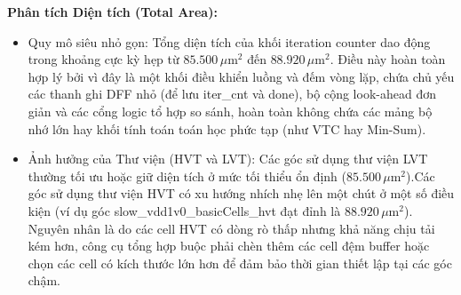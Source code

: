\documentclass[12pt,a4paper,oneside]{book}
\begin{document}
\begin{table}[H]
\centering
{}
\caption{Tổng hợp thông số Diện tích và Công suất của khối Iteration Counter qua các process corners.}
\end{table}

\textbf{Phân tích Diện tích (Total Area):}
\begin{itemize}
    \item Quy mô siêu nhỏ gọn: Tổng diện tích của khối iteration counter dao động trong khoảng cực kỳ hẹp từ $85.500\,\mu\text{m}^2$ đến $88.920\,\mu\text{m}^2$. Điều này hoàn toàn hợp lý bởi vì đây là một khối điều khiển luồng và đếm vòng lặp, chứa chủ yếu các thanh ghi DFF nhỏ (để lưu iter\_cnt và done), bộ cộng look-ahead đơn giản và các cổng logic tổ hợp so sánh, hoàn toàn không chứa các mảng bộ nhớ lớn hay khối tính toán toán học phức tạp (như VTC hay Min-Sum).
    \item Ảnh hưởng của Thư viện (HVT và LVT): Các góc sử dụng thư viện LVT thường tối ưu hoặc giữ diện tích ở mức tối thiểu ổn định ($85.500\,\mu\text{m}^2$).Các góc sử dụng thư viện HVT có xu hướng nhích nhẹ lên một chút ở một số điều kiện (ví dụ góc slow\_vdd1v0\_basicCells\_hvt đạt đỉnh là $88.920\,\mu\text{m}^2$). Nguyên nhân là do các cell HVT có dòng rò thấp nhưng khả năng chịu tải kém hơn, công cụ tổng hợp buộc phải chèn thêm các cell đệm buffer hoặc chọn các cell có kích thước lớn hơn để đảm bảo thời gian thiết lập tại các góc chậm.
\end{itemize}
\end{document}
